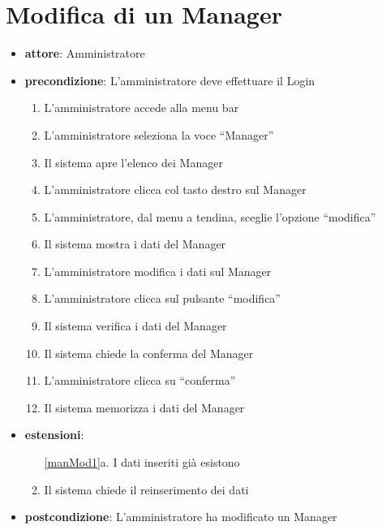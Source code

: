 \section{Modifica di un Manager}
\begin{itemize}
	\item \textbf{attore}: Amministratore
	\item \textbf{precondizione}: L’amministratore deve effettuare il Login
	
	\begin{enumerate}
		\item L’amministratore accede alla menu bar
		\item L’amministratore seleziona la voce “Manager”
		\item Il sistema apre l’elenco dei Manager
		\item L’amministratore clicca col tasto destro sul Manager
		\item L’amministratore, dal menu a tendina, sceglie l’opzione “modifica”
		\item Il sistema mostra i dati del Manager
		\item L’amministratore modifica i dati sul Manager
		\item L’amministratore clicca sul pulsante “modifica”
		\label{manMod1}
		\item Il sistema verifica i dati del Manager
		\item Il sistema chiede la conferma del Manager
		\item L’amministratore clicca su “conferma”
		\item Il sistema memorizza i dati del Manager
	\end{enumerate}

	\item \textbf{estensioni}:
	\begin{enumerate}
		\item[\ref{manMod1}a.] I dati inseriti già esistono
		\item Il sistema chiede il reinserimento dei dati
	\end{enumerate}

	\item \textbf{postcondizione}: L’amministratore ha modificato un Manager
\end{itemize}

		

